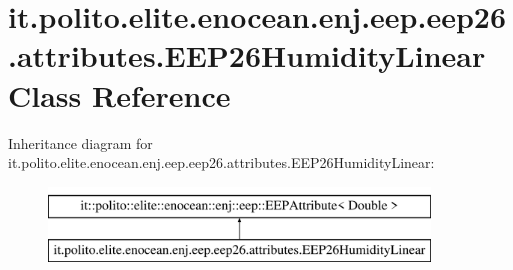 \hypertarget{classit_1_1polito_1_1elite_1_1enocean_1_1enj_1_1eep_1_1eep26_1_1attributes_1_1_e_e_p26_humidity_linear}{}\section{it.\+polito.\+elite.\+enocean.\+enj.\+eep.\+eep26.\+attributes.\+E\+E\+P26\+Humidity\+Linear Class Reference}
\label{classit_1_1polito_1_1elite_1_1enocean_1_1enj_1_1eep_1_1eep26_1_1attributes_1_1_e_e_p26_humidity_linear}
Inheritance diagram for it.\+polito.\+elite.\+enocean.\+enj.\+eep.\+eep26.\+attributes.\+E\+E\+P26\+Humidity\+Linear\+:\begin{figure}[H]
\begin{center}
\leavevmode
\includegraphics[height=2.000000cm]{classit_1_1polito_1_1elite_1_1enocean_1_1enj_1_1eep_1_1eep26_1_1attributes_1_1_e_e_p26_humidity_linear}
\end{center}
\end{figure}
